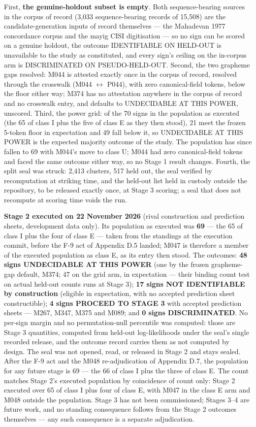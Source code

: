 \documentclass[11pt]{article}
\begin{document}
First, \textbf{the genuine-holdout subset is empty}. Both
sequence-bearing sources in the corpus of record (3,033
sequence-bearing records of 15,508) are the candidate-generation
inputs of record themselves --- the Mahadevan 1977 concordance
corpus and the mayig CISI digitisation --- so no sign can be
scored on a genuine holdout, the outcome IDENTIFIABLE ON
HELD-OUT is unavailable to the study as constituted, and every
sign's ceiling on the in-corpus arm is DISCRIMINATED ON
PSEUDO-HELD-OUT. Second, the two grapheme gaps resolved: M044 is
attested exactly once in the corpus of record, resolved through
the crosswalk (M044 $\leftrightarrow$ P044), with zero
canonical-field tokens, below the floor either way; M374 has no
attestation anywhere in the corpus of record and no crosswalk
entry, and defaults to UNDECIDABLE AT THIS POWER, unscored.
Third, the power grid: of the 70 signs in the population as
executed (the 65 of class I plus the five of class E as they
then stood), 21 meet the frozen 5-token floor in expectation and
49 fall below it, so UNDECIDABLE AT THIS POWER is the expected
majority outcome of the study. The population has since fallen
to 69 with M044's move to class U; M044 had zero canonical-field
tokens and faced the same outcome either way, so no Stage 1
result changes. Fourth, the split seal was struck: 2,413
clusters, 517 held out, the seal verified by recomputation at
striking time, and the held-out list held in custody outside the
repository, to be released exactly once, at Stage 3 scoring; a
seal that does not recompute at scoring time voids the run.

\textbf{Stage 2 executed on 22 November 2026} (rival
construction and prediction sheets, development data only). Its
population as executed was \textbf{69} --- the 65 of class I
plus the four of class E --- taken from the standings at the
execution commit, before the F-9 act of Appendix D.5 landed;
M047 is therefore a member of the executed population as class
E, as its entry then stood. The outcomes: \textbf{48 signs
UNDECIDABLE AT THIS POWER} (one by the frozen grapheme-gap
default, M374; 47 on the grid arm, in expectation --- their
binding count test on actual held-out counts runs at Stage 3);
\textbf{17 signs NOT IDENTIFIABLE by construction} (eligible in
expectation, with no accepted prediction sheet constructible);
\textbf{4 signs PROCEED TO STAGE 3} with accepted prediction
sheets --- M267, M347, M375 and M089; and \textbf{0 signs
DISCRIMINATED}. No per-sign margin and no permutation-null
percentile was computed: those are Stage 3 quantities, computed
from held-out log-likelihoods under the seal's single recorded
release, and the outcome record carries them as not computed by
design. The seal was not opened, read, or released in Stage 2
and stays sealed. After the F-9 act and the M048
re-adjudication of Appendix D.7, the population for any future
stage is 69 --- the 66 of class I plus the three of class E.
The count matches Stage 2's executed population by coincidence
of count only: Stage 2 executed over 65 of class I plus four of
class E, with M047 in the class E arm and M048 outside the
population. Stage 3 has not been commissioned;
Stages 3--4 are future work, and no standing consequence follows
from the Stage 2 outcomes themselves --- any such consequence
is a separate adjudication.
\end{document}
